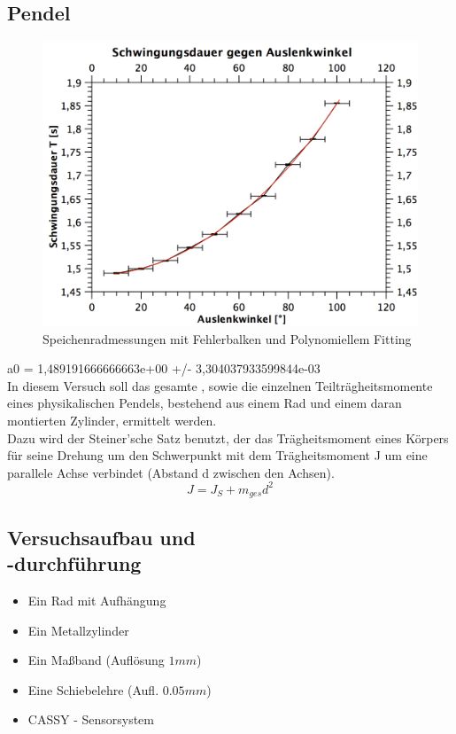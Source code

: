 \documentclass[12pt,a4paper]{article}
\begin{document}
\begin{multicols}{2}
\begin{itemize}


\section{Pendel}
\begin{figure}[H]
	\centering
  	\includegraphics[scale=0.45]{./figure/speichenrad_fit_error.png}
	\caption{Speichenradmessungen mit Fehlerbalken und Polynomiellem Fitting}
	\label{fig:rad_fit}
\end{figure}
a0 = 1,489191666666663e+00 +/- 3,304037933599844e-03\\
In diesem Versuch soll das gesamte , sowie die einzelnen Teilträgheitsmomente eines physikalischen Pendels, bestehend aus einem Rad und einem daran montierten Zylinder, ermittelt werden.\\
Dazu wird der Steiner'sche Satz benutzt, der das Trägheitsmoment eines Körpers für seine Drehung um den Schwerpunkt mit dem Trägheitsmoment J um eine parallele Achse verbindet (Abstand d zwischen den Achsen).\\
$$ J = J_{S} + m_{ges}d^2 $$

\subsection{Versuchsaufbau und \\-durchführung}

\begin{itemize}
	\item Ein Rad mit Aufhängung
	\item Ein Metallzylinder
	\item Ein Maßband (Auflösung $1 mm$)
	\item Eine Schiebelehre (Aufl. $0.05mm$)
	\item CASSY - Sensorsystem
\end{itemize}


\end{itemize}
\end{multicols}
\end{document}
